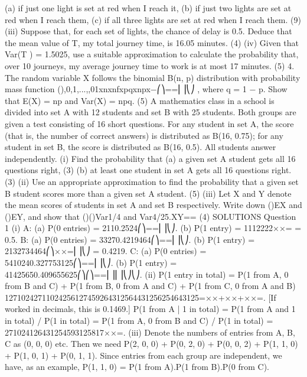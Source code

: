 (a) if just one light is set at red when I reach it,
(b) if just two lights are set at red when I reach them,
(c) if all three lights are set at red when I reach them.
(9)
(iii) Suppose that, for each set of lights, the chance of delay is 0.5. Deduce that the mean value of T, my total journey time, is 16.05 minutes.
(4)
(iv) Given that Var(T ) = 1.5025, use a suitable approximation to calculate the probability that, over 10 journeys, my average journey time to work is at most 17 minutes.
(5)
4. The random variable X follows the binomial B(n, p) distribution with probability mass function
(),0,1,...,,01xnxnfxpqxnpx−⎛⎞==⎜⎟⎝⎠ ,
where q = 1 − p. Show that E(X) = np and Var(X) = npq.
(5)
A mathematics class in a school is divided into set A with 12 students and set B with 25 students. Both groups are given a test consisting of 16 short questions. For any student in set A, the score (that is, the number of correct answers) is distributed as B(16, 0.75); for any student in set B, the score is distributed as B(16, 0.5). All students answer independently.
(i) Find the probability that
(a) a given set A student gets all 16 questions right,
(3)
(b) at least one student in set A gets all 16 questions right.
(3)
(ii) Use an appropriate approximation to find the probability that a given set B student scores more than a given set A student.
(5)
(iii) Let X and Y denote the mean scores of students in set A and set B respectively. Write down ()EX and ()EY, and show that ()()Var1/4 and Var4/25.XY==
(4)
SOLUTIONS
Question 1
(i) A: (a) P(0 entries) = 2110.2524⎛⎞==⎜⎟⎝⎠.
(b) P(1 entry) = 1112222××= = 0.5.
B: (a) P(0 entries) = 33270.4219464⎛⎞==⎜⎟⎝⎠.
(b) P(1 entry) = 2132734464⎛⎞××=⎜⎟⎝⎠ = 0.4219.
C: (a) P(0 entries) = 5410240.327753125⎛⎞==⎜⎟⎝⎠.
(b) P(1 entry) = 41425650.409655625⎛⎞⎛⎞==⎜⎟⎜⎟⎝⎠⎝⎠.
(ii) P(1 entry in total)
= P(1 from A, 0 from B and C) + P(1 from B, 0 from A and C)
+ P(1 from C, 0 from A and B) 12710242711024256127459264312564431256254643125=××+××+××=.
[If worked in decimals, this is 0.1469.]
P(1 from A | 1 in total) = P(1 from A and 1 in total) / P(1 in total)
= P(1 from A, 0 from B and C) / P(1 in total)
= 271024126431254593125817××=.
(iii) Denote the numbers of entries from A, B, C as (0, 0, 0) etc. Then we need P(2, 0, 0) + P(0, 2, 0) + P(0, 0, 2) + P(1, 1, 0) + P(1, 0, 1) + P(0, 1, 1). Since entries from each group are independent, we have, as an example, P(1, 1, 0) = P(1 from A).P(1 from B).P(0 from C).
